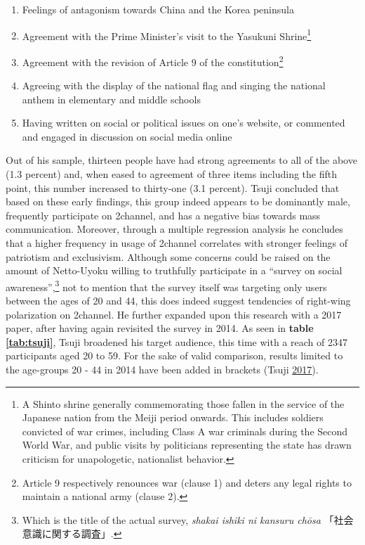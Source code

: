 \documentclass[10pt,british,A4paper,,openany]{memoir}
\providecommand{\tightlist}{%
  \setlength{\itemsep}{0pt}\setlength{\parskip}{0pt}}
\begin{document}
\begin{enumerate}
\def\labelenumi{\arabic{enumi}.}
\tightlist
\item
  Feelings of antagonism towards China and the Korea peninsula
\item
  Agreement with the Prime Minister's visit to the Yasukuni
  Shrine\footnote{A Shinto shrine generally commemorating those fallen
    in the service of the Japanese nation from the Meiji period onwards.
    This includes soldiers convicted of war crimes, including Class A
    war criminals during the Second World War, and public visits by
    politicians representing the state has drawn criticism for
    unapologetic, nationalist behavior.}
\item
  Agreement with the revision of Article 9 of the constitution\footnote{Article
    9 respectively renounces war (clause 1) and deters any legal rights
    to maintain a national army (clause 2).}
\item
  Agreeing with the display of the national flag and singing the
  national anthem in elementary and middle schools
\item
  Having written on social or political issues on one's website, or
  commented and engaged in discussion on social media online
\end{enumerate}

Out of his sample, thirteen people have had strong agreements to all of
the above (1.3 percent) and, when eased to agreement of three items
including the fifth point, this number increased to thirty-one (3.1
percent). Tsuji concluded that based on these early findings, this group
indeed appears to be dominantly male, frequently participate on
2channel, and has a negative bias towards mass communication. Moreover,
through a multiple regression analysis he concludes that a higher
frequency in usage of 2channel correlates with stronger feelings of
patriotism and exclusivism. Although some concerns could be raised on
the amount of Netto-Uyoku willing to truthfully participate in a
``survey on social awareness'',\footnote{Which is the title of the
  actual survey, \emph{shakai ishiki ni kansuru chōsa}
  「社会意識に関する調査」.} not to mention that the survey itself was
targeting only users between the ages of 20 and 44, this does indeed
suggest tendencies of right-wing polarization on 2channel. He further
expanded upon this research with a 2017 paper, after having again
revisited the survey in 2014. As seen in \textbf{table \ref{tab:tsuji}},
Tsuji broadened his target audience, this time with a reach of 2347
participants aged 20 to 59. For the sake of valid comparison, results
limited to the age-groups 20 - 44 in 2014 have been added in brackets
(Tsuji \protect\hyperlink{ref-tsuji_eng._2017}{2017}).
\end{document}
